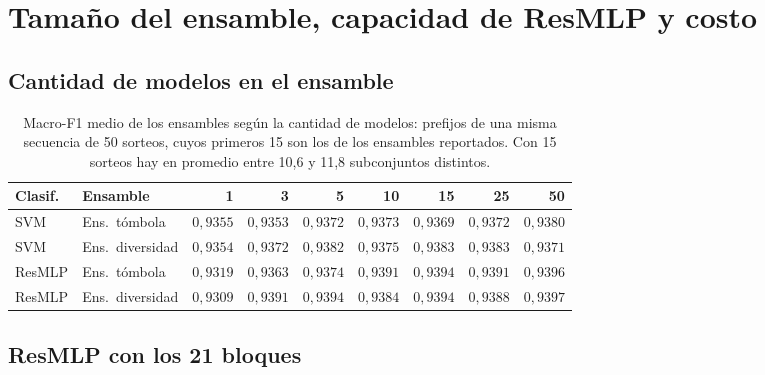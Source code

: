 \documentclass[11pt,a4paper]{article}
\begin{document}
\section{Tamaño del ensamble, capacidad de ResMLP y costo}

\subsection{Cantidad de modelos en el ensamble}

\begin{table}[H]
\centering\fontsize{8}{10}\selectfont\setlength{\tabcolsep}{3.0pt}
\caption{Macro-F1 medio de los ensambles según la cantidad de modelos: prefijos de una misma secuencia de 50 sorteos, cuyos primeros 15 son los de los ensambles reportados. Con 15 sorteos hay en promedio entre 10,6 y 11,8 subconjuntos distintos.}
\label{tab:sel-size}
\begin{tabular}{@{}llrrrrrrr@{}}
\toprule
Clasif. & Ensamble & 1 & 3 & 5 & 10 & 15 & 25 & 50 \\
\midrule
SVM & Ens.\ tómbola & $0{,}9355$ & $0{,}9353$ & $0{,}9372$ & $0{,}9373$ & $0{,}9369$ & $0{,}9372$ & $0{,}9380$ \\
SVM & Ens.\ diversidad & $0{,}9354$ & $0{,}9372$ & $0{,}9382$ & $0{,}9375$ & $0{,}9383$ & $0{,}9383$ & $0{,}9371$ \\
ResMLP & Ens.\ tómbola & $0{,}9319$ & $0{,}9363$ & $0{,}9374$ & $0{,}9391$ & $0{,}9394$ & $0{,}9391$ & $0{,}9396$ \\
ResMLP & Ens.\ diversidad & $0{,}9309$ & $0{,}9391$ & $0{,}9394$ & $0{,}9384$ & $0{,}9394$ & $0{,}9388$ & $0{,}9397$ \\
\bottomrule
\end{tabular}
\end{table}

\subsection{ResMLP con los 21 bloques}
\end{document}
